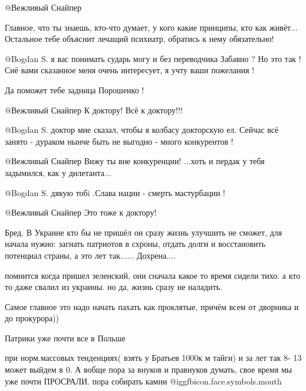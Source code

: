 \begin{itemize}
\begin{itemize}

@Вежливый Снайпер  

Главное, что ты знаешь, кто-что думает, у кого какие принципы, кто как живёт...
Остальное тебе объяснит лечащий психиатр, обратись к нему обязательно!


 @Bogdan S.  я вас понимать сударь могу и без переводчика
Забавно ? Но это так !
Сиё вами сказанное меня очень интересует, я учту ваши пожелания ! 

Да поможет тебе задница Порошенко !

 @Вежливый Снайпер  К доктору!
Всё к доктору!!!


@Bogdan S.  доктор мне сказал, чтобы я колбасу докторскую ел. Сейчас всё
занято - дураком нынче быть не выгодно - много конкурентов !

 @Вежливый Снайпер  
Вижу ты вне конкуренции!
...хоть и пердак у тебя задымился, как у дилетанта...

 @Bogdan S.  дякую тобi  .Слава нации - смерть мастурбации !

 @Вежливый Снайпер  
Это тоже к доктору!

\end{itemize} %


Бред. В Украине кто бы не пришёл он сразу жизнь улучшить не сможет, для начала
нужно: загнать патриотов в схроны, отдать долги и восстановить потенциал
страны, а это лет так...... Дохрена....

\begin{itemize} %

помнится когда пришел зеленский, они сначала какое то время сидели тихо. а кто
то даже свалил из украины.  но да, жизнь сразу не наладить.


Самое главное это надо начать пахать как проклятые, причём всем от дворника и до прокурора))


Патрики уже почти все в Польше


при норм.массовых тенденциях( взять у Братьев 1000к м тайги) и за лет так 8- 13
может выйдем в 0. А вобще пора за внуков и правнуков думать, свое время мы уже
почти ПРОСРАЛИ. пора собирать камни @igg{fbicon.face.symbols.mouth} 



\end{itemize}
\end{itemize}
